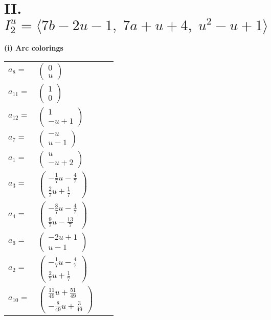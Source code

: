 \documentclass[1p]{elsarticle_modified}
\theoremstyle{definition}
\begin{document}
\centering \section*{II. $I^u_{2}= \langle 7 b-2 u-1,\;7 a+u+4,\;u^2- u+1 \rangle$}
\flushleft \textbf{(i) Arc colorings}\\
\begin{tabular}{m{7pt} m{180pt} m{7pt} m{180pt} }
\flushright $a_{8}=$&$\begin{pmatrix}0\\u\end{pmatrix}$ \\
\flushright $a_{11}=$&$\begin{pmatrix}1\\0\end{pmatrix}$ \\
\flushright $a_{12}=$&$\begin{pmatrix}1\\- u+1\end{pmatrix}$ \\
\flushright $a_{7}=$&$\begin{pmatrix}- u\\u-1\end{pmatrix}$ \\
\flushright $a_{1}=$&$\begin{pmatrix}u\\- u+2\end{pmatrix}$ \\
\flushright $a_{3}=$&$\begin{pmatrix}-\frac{1}{7} u-\frac{4}{7}\\\frac{2}{7} u+\frac{1}{7}\end{pmatrix}$ \\
\flushright $a_{4}=$&$\begin{pmatrix}-\frac{8}{7} u-\frac{4}{7}\\\frac{9}{7} u-\frac{13}{7}\end{pmatrix}$ \\
\flushright $a_{6}=$&$\begin{pmatrix}-2 u+1\\u-1\end{pmatrix}$ \\
\flushright $a_{2}=$&$\begin{pmatrix}-\frac{1}{7} u-\frac{4}{7}\\\frac{2}{7} u+\frac{1}{7}\end{pmatrix}$ \\
\flushright $a_{10}=$&$\begin{pmatrix}\frac{11}{49} u+\frac{51}{49}\\-\frac{8}{49} u+\frac{3}{49}\end{pmatrix}$ \\

\end{tabular}
\end{document}

